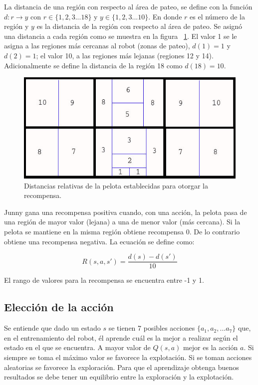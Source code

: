 La distancia de una región con respecto al área de pateo, se define con la función $d: r \rightarrow y$ con $r \in \{1,2,3 ...18\}$ y $y \in \{1,2,3 ...10\}$. En donde $r$ es el número de la región y $y$ es la distancia de la región con respecto al \'area de pateo. Se asign\'o una distancia a cada regi\'on como se muestra en la figura ~\ref{fig:distancias}. El valor 1 se le asigna a las regiones m\'as cercanas al robot (zonas de pateo), $d(1)= 1$ y $d(2)=1$; el valor 10, a las regiones m\'as lejanas (regiones 12 y 14). Adicionalmente se define la distancia de la región 18 como $d(18)=10$. 
     
\begin{figure}[hbtp]
\centering
\includegraphics[scale=0.5]{imagenes/Distancias2.jpg}
\caption{Distancias relativas de la pelota establecidas para otorgar la recompensa.}
\label{fig:distancias}
\end{figure}

Junny gana una recompensa positiva cuando, con una acción, la pelota pasa de una región de mayor valor (lejana) a una de menor valor (más cercana). Si la pelota se mantiene en la misma región obtiene recompensa 0. De lo contrario obtiene una recompensa negativa. La ecuación se define como:



\begin{equation}
R(s,a,s') = \dfrac{d(s) - d(s')}{10}
\end{equation}


El rango de valores para la recompensa se encuentra entre -1 y 1. 


\subsection{Elecci\'on de la acci\'on}\label{subsec:eleccionAccion}

Se entiende que dado un estado $s$ se tienen 7 posibles acciones $\{a_1, a_2, ... a_7\}$ que, en el entrenamiento del robot, él aprende cuál es la mejor a realizar según el estado en el que se encuentra. A mayor valor de $Q(s,a)$ mejor es la acción $a$. Si siempre se toma el máximo valor se favorece la explotación. Si se toman acciones aleatorias se favorece la exploración. Para que el aprendizaje obtenga buenos resultados se debe tener un equilibrio entre la exploración y la explotación. 

